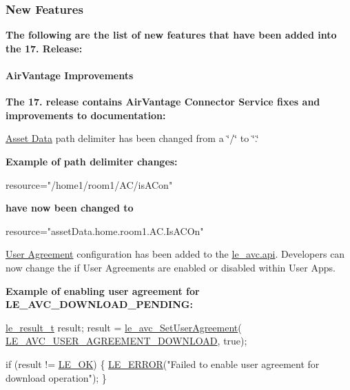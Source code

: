 {\bfseries }\hypertarget{releaseNotes17081_rn1708_Features}{}\subsubsection{New Features}\label{releaseNotes17081_rn1708_Features}
{\bfseries  The following are the list of new features that have been added into the 17. Release\+:}

{\bfseries }\hypertarget{releaseNotes17081_rn1708_Features_AV}{}\paragraph{Air\+Vantage Improvements}\label{releaseNotes17081_rn1708_Features_AV}
{\bfseries  The 17. release contains Air\+Vantage Connector Service fixes and improvements to documentation\+:
\begin{DoxyItemize}
\item \hyperlink{avExchangeData_avExchangeData_avAPI_Read}{Asset Data} path delimiter has been changed from a \char`\"{}/\char`\"{} to \char`\"{}.\char`\"{}
\end{DoxyItemize}}

{\bfseries Example of path delimiter changes\+: 
\begin{DoxyCode}
resource=\textcolor{stringliteral}{"/home1/room1/AC/isACon"}
\end{DoxyCode}
 {\bfseries have now been changed to } 
\begin{DoxyCode}
resource=\textcolor{stringliteral}{"assetData.home.room1.AC.IsACOn"}
\end{DoxyCode}
}

{\bfseries 
\begin{DoxyItemize}
\item \hyperlink{c_le_avc_c_le_avc_user_agreement}{User Agreement} configuration has been added to the \hyperlink{c_le_avc}{le\+\_\+avc.api}. Developers can now change the if User Agreements are enabled or disabled within User Apps.
\end{DoxyItemize}}

{\bfseries Example of enabling user agreement for L\+E\+\_\+\+A\+V\+C\+\_\+\+D\+O\+W\+N\+L\+O\+A\+D\+\_\+\+P\+E\+N\+D\+I\+NG\+: 
\begin{DoxyCode}
\hyperlink{le__basics_8h_a1cca095ed6ebab24b57a636382a6c86c}{le\_result\_t} result;
result = \hyperlink{le__avc__interface_8h_a5461f5a97551672fc8a6a21fbe6cb340}{le\_avc\_SetUserAgreement}(
      \hyperlink{le__avc__interface_8h_aee732a128f19f788ffb4dbe367533baba4b2876c74091baf85da8a7a65a8d9334}{LE\_AVC\_USER\_AGREEMENT\_DOWNLOAD}, \textcolor{keyword}{true});

\textcolor{keywordflow}{if} (result != \hyperlink{le__basics_8h_a1cca095ed6ebab24b57a636382a6c86ca5066a4bcec691c6b67843b8f79656422}{LE\_OK})
\{
    \hyperlink{le__log_8h_a353590f91b3143a7ba3a416ae5a50c3d}{LE\_ERROR}(\textcolor{stringliteral}{"Failed to enable user agreement for download operation"});
\}
\end{DoxyCode}
}

